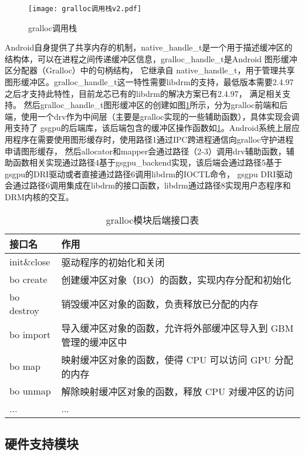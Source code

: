 \begin{figure}[H]
  \centering
  \texttt{[image: gralloc调用栈v2.pdf]}
  \caption{gralloc调用栈}
  \label{fig:gralloc调用栈}
\end{figure}

Android自身提供了共享内存的机制，native\_handle\_t是一个用于描述缓冲区的结构体，可以在进程之间传递缓冲区信息，gralloc\_handle\_t是Android 图形缓冲区分配器（Gralloc）中的句柄结构，
它继承自 native\_handle\_t，用于管理共享图形缓冲区。gralloc\_handle\_t这一特性需要libdrm的支持，最低版本需要2.4.97之后才支持此特性，目前龙芯已有的libdrm的解决方案已有2.4.97，
满足相关支持。
然后gralloc\_handle\_t图形缓冲区的创建如图\ref{fig:gralloc调用栈}所示，分为gralloc前端和后端，使用一个drv作为中间层（主要是gralloc实现的一些辅助函数），具体实现会调用支持了
gsgpu的后端库，该后端包含的缓冲区操作函数如\ref{tab:gralloc模块后端接口表}。Android系统上层应用程序在需要使用图形缓存时，使用路径1通过IPC跨进程通信向gralloc守护进程申请图形缓存，
然后allocator和mapper会通过路径（2-3）调用drv辅助函数，辅助函数相关实现通过路径4基于gsgpu\_backend实现，该后端会通过路径5基于gsgpu的DRI驱动或者直接通过路径6调用libdrm的IOCTL命令，
gsgpu DRI驱动会通过路径6调用集成在libdrm的接口函数，libdrm通过路径8实现用户态程序和DRM内核的交互。

\begin{table}[H]  
  \centering
  \caption{gralloc模块后端接口表}
  \label{tab:gralloc模块后端接口表}
  \begin{tabular}{ll}
    \toprule
    接口名  & 作用\\
    \midrule
    init\&close & 驱动程序的初始化和关闭 \\
    bo create & 创建缓冲区对象（BO）的函数，实现内存分配和初始化 \\
    bo destroy & 销毁缓冲区对象的函数，负责释放已分配的内存 \\
    bo import & 导入缓冲区对象的函数，允许将外部缓冲区导入到 GBM 管理的缓冲区中 \\
    bo map & 映射缓冲区对象的函数，使得 CPU 可以访问 GPU 分配的内存 \\
    bo unmap & 解除映射缓冲区对象的函数，释放 CPU 对缓冲区的访问 \\
    ... & ... \\
    \bottomrule
  \end{tabular}
  \note{}
\end{table}

\subsection{硬件支持模块}

